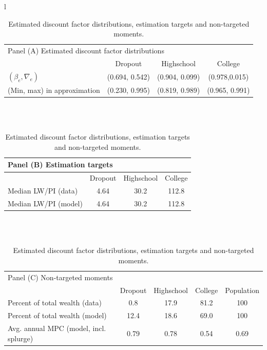 \documentclass[../HAFiscal]{subfiles}
\begin{document}
\begin{table}[th]
\begin{center}
\begin{tabular}{l}
	\begin{tabular}{lccc}
		\multicolumn{4}{l}{Panel (A) Estimated discount factor distributions} \\ 
		& Dropout & Highschool & College \\ \midrule
		$(\beta_e, \nabla_e)$ & (0.694, 0.542) & (0.904, 0.099) & (0.978,0.015) \\
		(Min, max) in approximation & (0.230, 0.995) & (0.819, 0.989) & (0.965, 0.991) \\
		\midrule 
	\end{tabular} \\ \\ 
	
	\begin{tabular}{lccc}
		\multicolumn{4}{l}{Panel (B) Estimation targets} \\ \midrule
		& Dropout & Highschool & College \\ \midrule
		Median LW/PI (data) & 4.64 & 30.2 & 112.8 \\ 
		Median LW/PI (model) & 4.64 & 30.2 & 112.8 %
		\\ \midrule 
	\end{tabular} \\ \\ 
	
	\begin{tabular}{lcccc}
		\multicolumn{5}{l}{Panel (C) Non-targeted moments} \\ 
		& Dropout & Highschool & College & Population \\ \midrule
		Percent of total wealth (data) & 0.8 & 17.9 & 81.2 & 100 \\
		Percent of total wealth (model) & 12.4 & 18.6 & 69.0 & 100 \\
		Avg. annual MPC (model, incl. splurge) & 0.79 & 0.78 & 0.54 & 0.69
		\\ \bottomrule 
	\end{tabular}
\end{tabular}
\caption{Estimated discount factor distributions, estimation targets and non-targeted moments.}
\label{tab:estimBetas}
\end{center}
\end{table}
\end{document}
